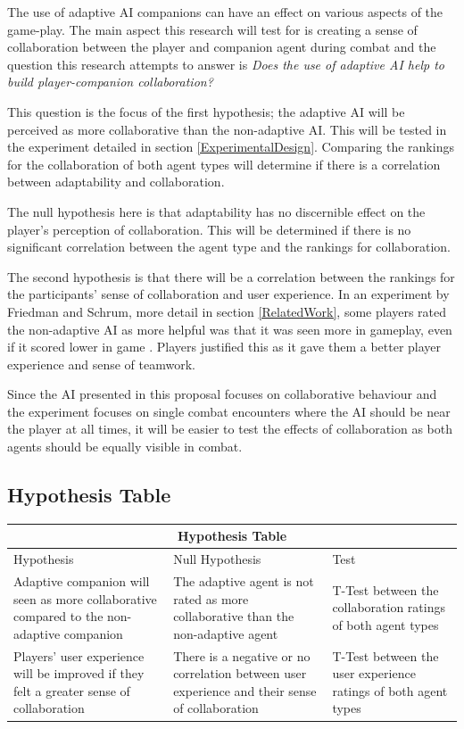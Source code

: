 \documentclass{IEEEtran}
\begin{document}
The use of adaptive AI companions can have an effect on various aspects of the game-play. The main aspect this research will test for is creating a sense of collaboration between the player and companion agent during combat and the question this research attempts to answer is \textit{Does the use of adaptive AI help to build player-companion collaboration?}

This question is the focus of the first hypothesis; the adaptive AI will be perceived as more collaborative than the non-adaptive AI. This will be tested in the experiment detailed in section \ref{ExperimentalDesign}. Comparing the rankings for the collaboration of both agent types will determine if there is a correlation between adaptability and collaboration.

The null hypothesis here is that adaptability has no discernible effect on the player's perception of collaboration. This will be determined if there is no significant correlation between the agent type and the rankings for collaboration.

The second hypothesis is that there will be a correlation between the rankings for the participants’ sense of collaboration and user experience. In an experiment by Friedman and Schrum, more detail in section \ref{RelatedWork}, some players rated the non-adaptive AI as more helpful was that it was seen more in gameplay, even if it scored lower in game \cite{CompanionBotsFPS2019}. Players justified this as it gave them a better player experience and sense of teamwork. 

Since the AI presented in this proposal focuses on collaborative behaviour and the experiment focuses on single combat encounters where the AI should be near the player at all times, it will be easier to test the effects of collaboration as both agents should be equally visible in combat. 

\subsection{Hypothesis Table}

\begin{tabular}{ |p{3cm}|p{3cm}|p{2cm}|  }
 \hline
 \multicolumn{3}{|c|}{Hypothesis Table} \\
 \hline
 Hypothesis & Null Hypothesis & Test\\
 \hline
    Adaptive companion will seen as more collaborative compared to the non-adaptive companion & 
    The adaptive agent is not rated as more collaborative than the non-adaptive agent &
    T-Test between the collaboration ratings of both agent types \\
 \hline
    Players' user experience will be improved if they felt a greater sense of collaboration & 
    There is a negative or no correlation between user experience and their sense of collaboration &
    T-Test between the user experience ratings of both agent types\\
 \hline
\end{tabular}
\end{document}
